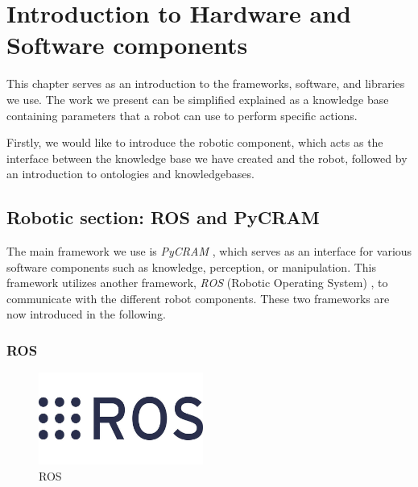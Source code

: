     \chapter{Introduction to Hardware and Software components}
	\label{chap:libraries}
    This chapter serves as an introduction to the frameworks, software, and libraries we use. The work we present can be simplified explained as a knowledge base containing parameters that a robot can use to perform specific actions.

    Firstly, we would like to introduce the robotic component, which acts as the interface between the knowledge base we have created and the robot, followed by an introduction to ontologies and knowledgebases.
    \section{Robotic section: ROS and PyCRAM}
    
    The main framework we use is \textit{PyCRAM} \cite{pycram}, which serves as an interface for various software components such as knowledge, perception, or manipulation. 
	This framework utilizes another framework, \textit{ROS} (Robotic Operating System) \cite{ros}, to communicate with the different robot components. These two frameworks are now introduced in the following.    
    \subsection{ROS}
	\label{sec:ROS}
    \begin{figure}
        \centering
        \includegraphics[width=0.48\textwidth]{Graphics/ROS.jpg}
		\caption{ROS \cite{ros}}
    \end{figure}

